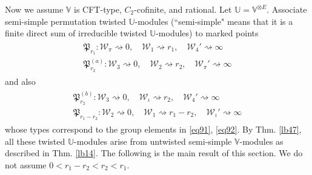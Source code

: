 \documentclass[12pt,a4paper,notitlepage]{article}
\theoremstyle{definition}
\theoremstyle{plain}
\newcommand{\fk}{\mathfrak}
\newcommand{\mc}{\mathcal}
\newcommand{\Vbb}{\mathbb V}
\newcommand{\Ubb}{\mathbb U}
\numberwithin{equation}{subsection}
\begin{document}
Now we assume $\Vbb$ is CFT-type, $C_2$-cofinite, and rational. Let $\Ubb=\Vbb^{\otimes E}$.  Associate semi-simple  permutation twisted $\Ubb$-modules (``semi-simple" means that it is a finite direct sum of irreducible twisted $\Ubb$-modules) to marked points
\begin{gather}\label{eq93}
	\begin{array}{c}
		\fk P_{r_1}: \mc W_\pi\rightsquigarrow 0,\quad \mc W_1\rightsquigarrow	r_1,\quad \mc W_4'\rightsquigarrow \infty\\[0.7ex]
		\fk P_{r_2}^{(a)}: \mc W_3\rightsquigarrow 0,\quad \mc W_2\rightsquigarrow	r_2,\quad \mc W_\pi'\rightsquigarrow \infty
	\end{array}
\end{gather}
and also
\begin{gather}\label{eq94}
	\begin{array}{c}
		\fk P_{r_2}^{(b)}: \mc W_3\rightsquigarrow 0,\quad \mc W_\iota\rightsquigarrow	r_2,\quad \mc W_4'\rightsquigarrow \infty\\[0.7ex]
		\fk P_{r_1-r_2}: \mc W_2\rightsquigarrow 0,\quad \mc W_1\rightsquigarrow	r_1-r_2,\quad \mc W_\iota'\rightsquigarrow \infty
	\end{array}
\end{gather}
whose types correspond to the group elements in \eqref{eq91}, \eqref{eq92}. By Thm. \ref{lb47}, all these twisted $\Ubb$-modules arise from untwisted  semi-simple $\Vbb$-modules as described in Thm. \ref{lb14}. The following is the main result of this section. We do not assume $0<r_1-r_2<r_2<r_1$. 
\end{document}

